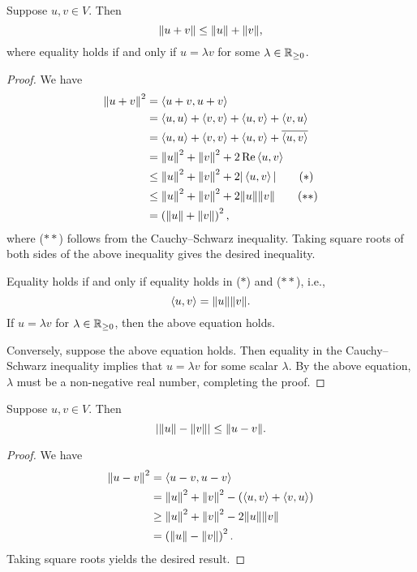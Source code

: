 \begin{lemma}
Suppose $u,v\in V$. Then
\begin{equation}
\norm{u+v}\le\norm{u}+\norm{v},
\end{equation}
where equality holds if and only if $u=\lambda v$ for some $\lambda\in\mathbb R_{\ge0}$.
\end{lemma}

\begin{proof}
We have
\begin{align*}
\norm{u+v}^2
&=\left\langle u+v,u+v\right\rangle\\
&=\left\langle u,u\right\rangle+\left\langle v,v\right\rangle+\left\langle u,v\right\rangle+\left\langle v,u\right\rangle\\
&=\left\langle u,u\right\rangle+\left\langle v,v\right\rangle+\left\langle u,v\right\rangle+\overline{\left\langle u,v\right\rangle}\\
&=\norm{u}^2+\norm{v}^2+2\Re\left\langle u,v\right\rangle\\
&\le\norm{u}^2+\norm{v}^2+2|\left\langle u,v\right\rangle|\tag{$\ast$}\\
&\le\norm{u}^2+\norm{v}^2+2\norm{u}\norm{v}\tag{$\ast\ast$}\\
&=\left(\norm{u}+\norm{v}\right)^2,
\end{align*}
where ($\ast\ast$) follows from the Cauchy--Schwarz inequality. Taking square roots of both sides of the above inequality gives the desired inequality.

Equality holds if and only if equality holds in ($\ast$) and ($\ast\ast$), i.e.,
\[\left\langle u,v\right\rangle=\norm{u}\norm{v}.\]
If $u=\lambda v$ for $\lambda\in\mathbb R_{\ge0}$, then the above equation holds. 

Conversely, suppose the above equation holds. Then equality in the Cauchy--Schwarz inequality implies that $u=\lambda v$ for some scalar $\lambda$. By the above equation, $\lambda$ must be a non-negative real number, completing the proof.
\end{proof}

\begin{corollary}
Suppose $u,v\in V$. Then
\[\left|\norm{u}-\norm{v}\right|\le\norm{u-v}.\]
\end{corollary}

\begin{proof}
We have
\begin{align*}
\norm{u-v}^2
&=\left\langle u-v,u-v\right\rangle\\
&=\norm{u}^2+\norm{v}^2-\left(\left\langle u,v\right\rangle+\left\langle v,u\right\rangle\right)\\
&\ge\norm{u}^2+\norm{v}^2-2\norm{u}\norm{v}\\
&=\left(\norm{u}-\norm{v}\right)^2.
\end{align*}
Taking square roots yields the desired result.
\end{proof}

